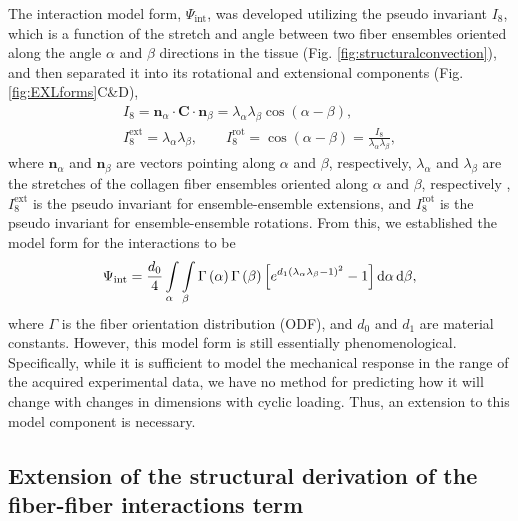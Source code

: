     The interaction model form, $\Psi_\mathrm{int}$, was developed utilizing the pseudo invariant $I_8$, which is a function of the stretch and angle between two fiber ensembles oriented along the angle $\alpha$ and $\beta$ directions in the tissue (Fig. \ref{fig:structuralconvection}), and then separated it into its rotational and extensional components\cite{sacks_novel_2015} (Fig. \ref{fig:EXLforms}C\&D),
\begin{equation} \label{eq:I8invariant}
\begin{gathered}
I_8 = \mathbf{n}_ \alpha \cdot\mathbf{C}\cdot\mathbf{n}_\beta = \lambda_\alpha \lambda_\beta \cos(\alpha - \beta), \\
I_8^{\mathrm{ext}} = \lambda_\alpha \lambda_\beta, \qquad I_8^{\mathrm{rot}} = \cos(\alpha - \beta) = \frac{I_8}{\lambda_\alpha \lambda_\beta},
\end{gathered}
\end{equation}
    where $\mathbf{n}_\alpha$ and $\mathbf{n}_\beta$ are vectors pointing along $\alpha$ and $\beta$, respectively, $\lambda_\alpha$ and $\lambda_\beta$ are the stretches of the collagen fiber ensembles oriented along $\alpha$ and $\beta$, respectively , $I_8^\mathrm{ext}$ is the pseudo invariant for ensemble-ensemble extensions, and $I_8^\mathrm{rot}$ is the pseudo invariant for ensemble-ensemble rotations. From this, we established the model form for the interactions to be
\begin{equation}
\Psi_{\mathrm{int}} = \frac{d_0}{4}\int\displaylimits_\alpha \int\displaylimits_\beta \Gamma\left(\alpha\right)\Gamma \left( \beta \right)\left[ e^{d_1(\lambda_\alpha \lambda_\beta - 1)^2}-1 \right] \mathrm{d}\alpha\, \mathrm{d}\beta,
\end{equation}
    where $\Gamma$ is the fiber orientation distribution (ODF), and $d_0$ and $d_1$ are material constants. 
	However, this model form is still essentially phenomenological. 
	Specifically, while it is sufficient to model the mechanical response in the range of the acquired experimental data, we have no method for predicting how it will change with changes in dimensions with cyclic loading. Thus, an extension to this model component is necessary.


\subsection{Extension of the structural derivation of the fiber-fiber interactions term}

